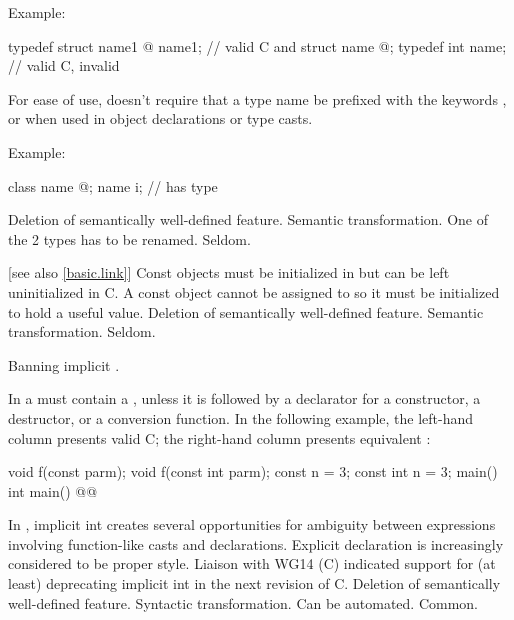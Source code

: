 Example:
\begin{codeblock}
typedef struct name1 { @\commentellip@ } name1;         // valid C and \Cpp{}
struct name { @\commentellip@ };
typedef int name;               // valid C, invalid \Cpp{}
\end{codeblock}

\rationale
For ease of use, \Cpp{} doesn't require that a type name be prefixed
with the keywords ,  or  when used in object
declarations or type casts.

Example:
\begin{codeblock}
class name { @\commentellip@ };
name i;                         //  has type 
\end{codeblock}

\effect
Deletion of semantically well-defined feature.
\difficulty
Semantic transformation.
One of the 2 types has to be renamed.
\howwide
Seldom.

 [see also \ref{basic.link}]
\change
Const objects must be initialized in \Cpp{} but can be left uninitialized in C.
\rationale
A const object cannot be assigned to so it must be initialized
to hold a useful value.
\effect
Deletion of semantically well-defined feature.
\difficulty
Semantic transformation.
\howwide
Seldom.

\change
Banning implicit .

In \Cpp{} a
must contain a
, unless
it is followed by a declarator for a constructor, a destructor, or a
conversion function.
In the following example, the
left-hand column presents valid C;
the right-hand column presents
equivalent \Cpp{}:

\begin{codeblock}
void f(const parm);            void f(const int parm);
const n = 3;                   const int n = 3;
main()                         int main()
    @\commentellip@                      @\commentellip@
\end{codeblock}

\rationale
In \Cpp{}, implicit int creates several opportunities for
ambiguity between expressions involving function-like
casts and declarations.
Explicit declaration is increasingly considered
to be proper style.
Liaison with WG14 (C) indicated support for (at least)
deprecating implicit int in the next revision of C.
\effect
Deletion of semantically well-defined feature.
\difficulty
Syntactic transformation.
Can be automated.
\howwide
Common.

